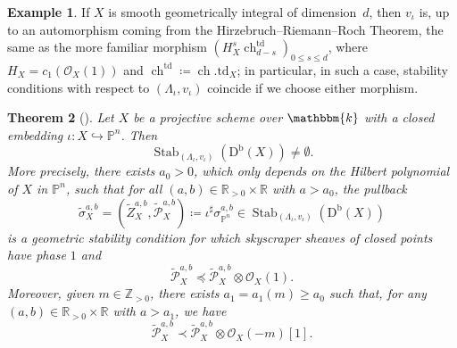\documentclass[11pt, reqno]{amsart}
\numberwithin{equation}{section}
\theoremstyle{plain}
\newtheorem{theorem}{Theorem}[section]
\theoremstyle{remark}
\theoremstyle{definition}
\newtheorem{example}[theorem]{Example}
\theoremstyle{italicsname}
\newcommand{\Db}{\mathrm{D^b}}
\DeclareMathOperator{\Stab}{Stab}
\DeclareMathOperator{\ch}{{ch}}
\newcommand{\td}{\mathrm{td}}
\newcommand{\cO}{\mathcal{O}}
\newcommand{\cP}{\mathscr{P}}
\newcommand{\KK}{\mathbbm{k}}
\def\RR{\ensuremath{\mathbb{R}}}
\def\ZZ{\ensuremath{\mathbb{Z}}}
\def\PP{\ensuremath{\mathbb{P}}}
\begin{document}
\begin{example}\label{ex:SmoothAbelianGroup}
If $X$ is smooth geometrically integral of dimension~$d$, then $v_{\iota}$ is, up to an automorphism coming from the Hirzebruch--Riemann--Roch Theorem, the same as the more familiar morphism $(H_X^s\ch^\mathrm{td}_{d-s})_{0\leq s\leq d}$, where $H_X=c_1(\cO_X(1))$ and $\ch^\mathrm{td}\coloneqq\ch.\td_X$; in particular, in such a case, stability conditions with respect to $(\Lambda_{\iota},v_{\iota})$ coincide if we choose either morphism.    
\end{example}

\begin{theorem}[{\cite{chunyi-stability}}]\label{thm:ProjectiveScheme}
Let $X$ be a projective scheme over $\KK$ with a closed embedding $\iota \colon X \hookrightarrow \PP^n$. 
Then 
\[
\Stab_{(\Lambda_{\iota},v_{\iota})}(\Db(X))\neq\emptyset.
\]
More precisely, there exists $a_0>0$, which only depends on the Hilbert polynomial of $X$ in $\PP^n$, such that for all $(a,b) \in \RR_{> 0} \times \RR$ with $a > a_0$, the pullback 
\begin{equation}\label{eq:Paris20260702}
\widetilde{\sigma}_X^{a,b}=(\widetilde{Z}_X^{a,b},\widetilde{\cP}_X^{a,b})\coloneqq\iota^\sharp\sigma_{\PP^n}^{a,b}\in\Stab_{(\Lambda_{\iota},v_{\iota})}(\Db(X))    
\end{equation}
is a geometric stability condition for which skyscraper sheaves of closed points have phase $1$ and 
\begin{equation}\label{eq:BayerPropertyX1}
\widetilde{\cP}^{a,b}_{X}\preceq\widetilde{\cP}^{a,b}_{X}\otimes\cO_{X}(1) .
\end{equation}
Moreover, given $m\in\ZZ_{>0}$, there exists $a_1=a_1(m)\geq a_0$ such that, for any $(a,b)\in\RR_{>0}\times\RR$ with $a>a_1$, we have 
\begin{equation}\label{eq:BayerPropertyX2}
\widetilde{\cP}^{a,b}_{X}\prec\widetilde{\cP}^{a,b}_{X}\otimes\cO_{X}(-m)[1].
\end{equation}
\end{theorem}
\end{document}
